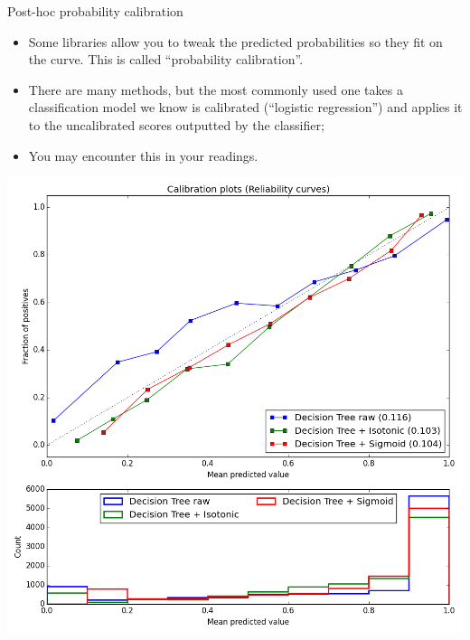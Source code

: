 \documentclass[xcolor=table,aspectratio=169]{beamer}
\begin{document}
\begin{frame}{Post-hoc probability calibration}
	\begin{itemize}
		\item Some libraries allow you to tweak the predicted probabilities
		so they fit on the curve. This is called ``probability
		calibration''.
		\item There are many methods, but the most commonly used one takes a
		classification model we know is calibrated (``logistic
		regression'') and applies it to the uncalibrated scores outputted
		by the classifier;
		\item You may encounter this in your readings.
	\end{itemize}
\end{frame}
\begin{frame}
	\includegraphics[height=\textheight]{pics/DT-calibration.png}
\end{frame}
\end{document}
